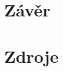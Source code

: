 \documentclass[11pt,a4paper]{article}
\begin{document}
\section{Závěr}

\newpage

\section{Zdroje}
    
    

    
    

          
\end{document}
